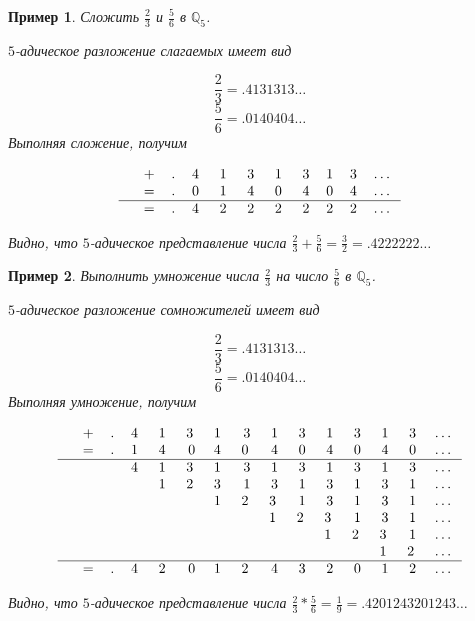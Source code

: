 \documentclass[master, och, diploma, times]{sty/SCWorks}
\theoremstyle{plain}
\newtheorem{exmp}{Пример}[section]
\theoremstyle{definition}
\numberwithin{equation}{section}
\begin{document}
\begin{exmp}
Сложить $\frac{2}{3}$ и $\frac{5}{6}$ в $\mathbb{Q}_5$.

\noindent $5$-адическое разложение слагаемых имеет вид

$$
\frac{2}{3}=.4131313\dots
$$
$$
\frac{5}{6}=.0140404\dots
$$
Выполняя сложение, получим

$$
\begin{tabular}{cccccccccccc}
& + & . & 4\; & 1\; & 3\; & 1\; & 3 & 1 & 3 & \dots \\
& = & . & 0\; & 1\; & 4\; & 0\; & 4 & 0 & 4 & \dots \\
\hline
& = & . & 4\; & 2\; & 2\; & 2\; & 2 & 2 & 2 & \dots
\end{tabular}
$$

\noindent Видно, что $5$-адическое представление числа $\frac{2}{3} + \frac{5}{6}=\frac{3}{2}=.4222222\dots$
\end{exmp}

\begin{exmp}
Выполнить умножение числа $\frac{2}{3}$ на число $\frac{5}{6}$ в $\mathbb{Q}_5$.

\noindent $5$-адическое разложение сомножителей имеет вид

$$
\frac{2}{3}=.4131313\dots
$$
$$
\frac{5}{6}=.0140404\dots
$$
Выполняя умножение, получим

$$
\begin{tabular}{ccccccccccccccccc}
& + & . & 4\; & 1\; & 3\; & 1\; & 3 & 1 & 3 & 1 & 3 & 1 & 3 & \dots \\
& = & . & 1\; & 4\; & 0 & 4\; & 0\; & 4 & 0 & 4 & 0 & 4 & 0 & \dots \\
\hline
& & & 4\; & 1\; & 3\; & 1\; & 3 & 1 & 3 & 1 & 3 & 1 & 3 & \dots \\
& & & & 1\; & 2\; & 3\; & 1 & 3 & 1 & 3 & 1 & 3 & 1 & \dots \\
& & & & & & 1\; & 2\; & 3\; & 1 & 3 & 1 & 3 & 1 & \dots \\
& & & & & & & & 1\; & 2\; & 3\; & 1 & 3 & 1 & \dots \\
& & & & & & & & & & 1\; & 2\; & 3\; & 1 &  \dots \\
& & & & & & & & & & & & 1\; & 2\; & \dots \\
\hline
& = & . & 4\; & 2\; & 0 & 1\; & 2\; & 4 & 3 & 2 & 0 & 1 & 2 & \dots \\
\end{tabular}
$$

\noindent Видно, что $5$-адическое представление числа $\frac{2}{3} * \frac{5}{6}=\frac{1}{9}=.4201243201243\dots$
\end{exmp}
\end{document}
